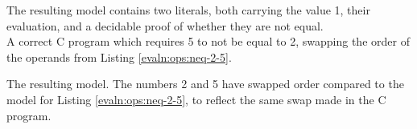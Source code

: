     The resulting model contains two literals, both carrying the value 1, their evaluation, and a decidable proof of whether they are not equal.
    \\
    
    
    A correct C program which requires 5 to not be equal to 2, swapping the order of the operands from Listing \ref{evaln:ops:neq-2-5}.
    
    The resulting \Idris model. The numbers 2 and 5 have swapped order compared to the model for Listing \ref{evaln:ops:neq-2-5}, to reflect the same swap made in the C program.
